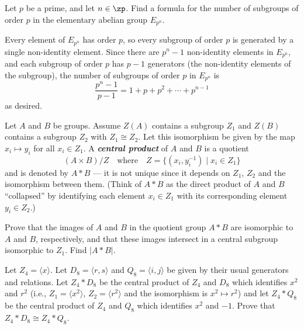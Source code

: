 \begin{exercise}\label{ex5.1.11}
    Let $p$ be a prime, and let $n \in \zp$. Find a formula for the number of subgroups of order $p$ in the elementary abelian group $E_{p^n}$.
\end{exercise}

\begin{sol}
    Every element of $E_{p^n}$ has order $p$, so every subgroup of order $p$ is generated by a single non-identity element. Since there are $p^n - 1$ non-identity elements in $E_{p^n}$, and each subgroup of order $p$ has $p - 1$ generators (the non-identity elements of the subgroup), the number of subgroups of order $p$ in $E_{p^n}$ is
    \[\frac{p^n - 1}{p - 1} = 1 + p + p^2 + \cdots + p^{n-1}\]
    as desired.
\end{sol}

\begin{specialexercise}\label{ex5.1.12}
    Let $A$ and $B$ be groups. Assume $Z(A)$ contains a subgroup $Z_1$ and $Z(B)$ contains a subgroup $Z_2$ with $Z_1 \cong Z_2$. Let this isomorphism be given by the map $x_i \mapsto y_i$ for all $x_i \in Z_1$. A \textbf{\textit{central product}} of $A$ and $B$ is a quotient
    \[(A \times B)/Z \quad \text{where} \quad Z = \{(x_i, y_i^{-1}) \mid x_i \in Z_1\}\]
    and is denoted by $A * B$ --- it is not unique since it depends on $Z_1$, $Z_2$ and the isomorphism between them. (Think of $A * B$ as the direct product of $A$ and $B$ ``collapsed'' by identifying each element $x_i \in Z_1$ with its corresponding element $y_i \in Z_2$.)
    \begin{subproblems}
        \item Prove that the images of $A$ and $B$ in the quotient group $A * B$ are isomorphic to $A$ and $B$, respectively, and that these images intersect in a central subgroup isomorphic to $Z_1$. Find $|A * B|$.
        \item Let $Z_4 = \langle x \rangle$. Let $D_8 = \langle r, s \rangle$ and $Q_8 = \langle i, j \rangle$ be given by their usual generators and relations. Let $Z_4 * D_8$ be the central product of $Z_4$ and $D_8$ which identifies $x^2$ and $r^2$ (i.e., $Z_1 = \langle x^2 \rangle$, $Z_2 = \langle r^2 \rangle$ and the isomorphism is $x^2 \mapsto r^2$) and let $Z_4 * Q_8$ be the central product of $Z_4$ and $Q_8$ which identifies $x^2$ and $-1$. Prove that $Z_4 * D_8 \cong Z_4 * Q_8$.
    \end{subproblems}
\end{specialexercise}

